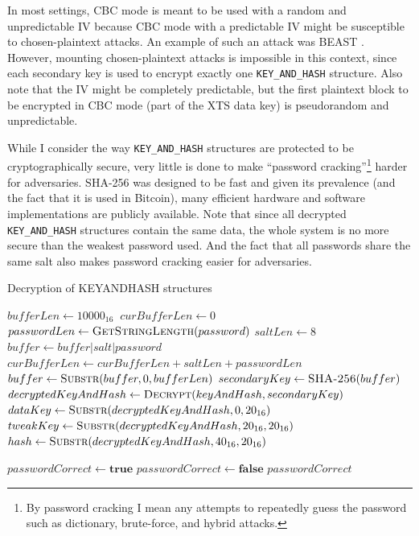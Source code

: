 \documentclass[thesis=B,english]{FITthesis}[2012/10/20]
\begin{document}
	In most settings, CBC mode is meant to be used with a random and unpredictable IV \cite{cbc} because CBC mode with a predictable IV might be susceptible to chosen-plaintext attacks. An example of such an attack was BEAST \cite{beast}. However, mounting chosen-plaintext attacks is impossible in this context, since each secondary key is used to encrypt exactly one \verb|KEY_AND_HASH| structure. Also note that the IV might be completely predictable, but the first plaintext block to be encrypted in CBC mode (part of the XTS data key) is pseudorandom and unpredictable. 
	
	While I consider the way \verb|KEY_AND_HASH| structures are protected to be cryptographically secure, very little is done to make ``password cracking''\footnote{By password cracking I mean any attempts to repeatedly guess the password such as dictionary, brute-force, and hybrid attacks.} harder for adversaries. SHA-256 was designed to be fast and given its prevalence (and the fact that it is used in Bitcoin), many efficient hardware and software implementations are publicly available. Note that since all decrypted \verb|KEY_AND_HASH| structures contain the same data, the whole system is no more secure than the weakest password used. And the fact that all passwords share the same salt also makes password cracking easier for adversaries.
	
	\begin{algorithm}
		\caption{Decryption of KEY\TextUnderscore{}AND\TextUnderscore{}HASH structures
			\label{alg:keydec}}
		\begin{algorithmic}[1]
			\State $bufferLen \gets 10000_{16} \ $
			\State $curBufferLen \gets 0 \ $
			\State $passwordLen \gets \Call{GetStringLength}{password}$
			\State $saltLen \gets 8$
			\State $buffer \gets buffer | salt | password$ 
			\State $curBufferLen \gets curBufferLen + saltLen + passwordLen$
			\EndWhile
			\State $buffer \gets \Call{Substr}{buffer, 0, bufferLen}$
			\State $secondaryKey \gets \Call{SHA-256}{buffer}$
			\State $decryptedKeyAndHash \gets \Call{Decrypt}{keyAndHash, secondaryKey}$
			\State $dataKey \gets \Call{Substr}{decryptedKeyAndHash, 0, 20_{16}}$
			\State $tweakKey \gets \Call{Substr}{decryptedKeyAndHash, 20_{16}, 20_{16}}$
			\State $hash \gets \Call{Substr}{decryptedKeyAndHash, 40_{16}, 20_{16}}$
			
			\State $passwordCorrect \gets \textbf{true}$
			\Else 
			\State $passwordCorrect \gets \textbf{false}$
			\EndIf
			\State 
			\Return $passwordCorrect$
			\EndFunction
		\end{algorithmic}
	\end{algorithm}
	
\end{document}
